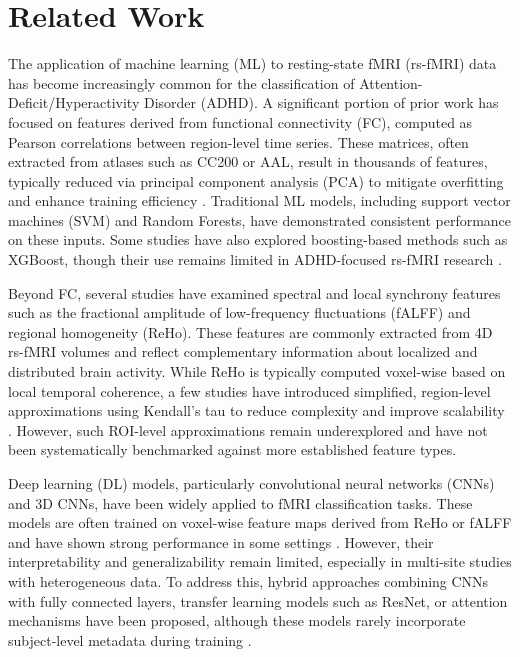 \documentclass[conference]{IEEEtran}
\begin{document}
\section{Related Work}
The application of machine learning (ML) to resting-state fMRI (rs-fMRI) data has become increasingly common for the classification of Attention-Deficit/Hyperactivity Disorder (ADHD). A significant portion of prior work has focused on features derived from functional connectivity (FC), computed as Pearson correlations between region-level time series. These matrices, often extracted from atlases such as CC200 or AAL, result in thousands of features, typically reduced via principal component analysis (PCA) to mitigate overfitting and enhance training efficiency \cite{taspinar2024, leung2016}. Traditional ML models, including support vector machines (SVM) and Random Forests, have demonstrated consistent performance on these inputs. Some studies have also explored boosting-based methods such as XGBoost, though their use remains limited in ADHD-focused rs-fMRI research \cite{taspinar2024, mahmoud2023}.

Beyond FC, several studies have examined spectral and local synchrony features such as the fractional amplitude of low-frequency fluctuations (fALFF) and regional homogeneity (ReHo). These features are commonly extracted from 4D rs-fMRI volumes and reflect complementary information about localized and distributed brain activity. While ReHo is typically computed voxel-wise based on local temporal coherence, a few studies have introduced simplified, region-level approximations using Kendall's tau to reduce complexity and improve scalability \cite{leung2016, zou2017}. However, such ROI-level approximations remain underexplored and have not been systematically benchmarked against more established feature types.

Deep learning (DL) models, particularly convolutional neural networks (CNNs) and 3D CNNs, have been widely applied to fMRI classification tasks. These models are often trained on voxel-wise feature maps derived from ReHo or fALFF and have shown strong performance in some settings \cite{mohamed2022, kumawat2023}. However, their interpretability and generalizability remain limited, especially in multi-site studies with heterogeneous data. To address this, hybrid approaches combining CNNs with fully connected layers, transfer learning models such as ResNet, or attention mechanisms have been proposed, although these models rarely incorporate subject-level metadata during training \cite{kumawat2023}.
\end{document}
